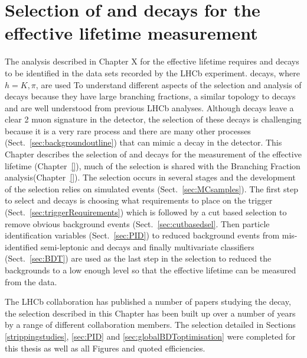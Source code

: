 

\chapter{Selection of \bsmumu and \bhh decays for the \bsmumu effective lifetime measurement}
\label{selection_chapter}


The analysis described in Chapter X for the \bsmumu effective lifetime requires \bsmumu and \bhh decays to be identified in the data sets recorded by the LHCb experiment. \bhh decays, where $h = K, \pi$, are used To understand different aspects of the selection and analysis of \bsmumu decays because they have large branching fractions, a similar topology to \bsmumu decays and are well understood from previous LHCb analyses. Although \bsmumu decays leave a clear 2 muon signature in the detector, the selection of these decays is challenging because it is a very rare process and there are many other processes (Sect.~\ref{sec:backgroundoutline}) that can mimic a \bsmumu decay in the detector. This Chapter describes the selection of \bmumu and \bhh decays for the measurement of the \bsmumu effective lifetime (Chapter~\ref{}), much of the selection is shared with the \bmumu Branching Fraction analysis(Chapter~\ref{}). The selection occurs in several stages and the development of the selection relies on simulated events (Sect.~\ref{sec:MCsamples}). The first step to select \bsmumu and \bhh decays is choosing what requirements to place on the trigger (Sect.~\ref{sec:triggerRequirements}) which is followed by a cut based selection to remove obvious background events (Sect.~\ref{sec:cutbasedsel}. Then particle identification variables (Sect.~\ref{sec:PID}) to reduced background events from mis-identified semi-leptonic and \bhh decays and finally multivariate classifiers (Sect.~\ref{sec:BDT}) are used as the last step in the selection to reduced the backgrounds to a low enough level so that the \bsmumu effective lifetime can be measured from the data. 

The LHCb collaboration has published a number of papers studying the \bsmumu decay, the selection described in this Chapter has been built up over a number of years by a range of different collaboration members. The selection detailed in Sections \ref{strippingstudies}, \ref{sec:PID} and \ref{sec:globalBDToptimisation} were completed for this thesis as well as all Figures and quoted efficiencies.


